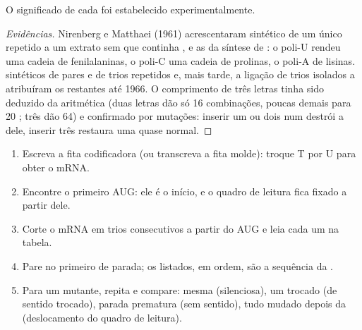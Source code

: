 \begin{proposition}\label{prop:g11:gene-expression:readcode}
O significado de cada  foi estabelecido experimentalmente.
\end{proposition}
\begin{proof}[Evidências]
Nirenberg e Matthaei (1961) acrescentaram  sintético de um único
 repetido a um extrato sem  que continha ,
 e as  da síntese de : o poli-U rendeu uma
cadeia de fenilalaninas, o poli-C uma cadeia de prolinas, o poli-A de
lisinas.  sintéticos de pares e de trios repetidos e, mais tarde, a
ligação de trios isolados a  atribuíram os  restantes
até 1966. O comprimento de três letras tinha sido deduzido da
aritmética (duas letras dão só 16 combinações, poucas demais para 20
; três dão 64) e confirmado por mutações: inserir um ou dois
 num  destrói a  dele, inserir três restaura
uma  quase normal.
\end{proof}

\begin{method}\label{met:g11:gene-expression:translate}
\begin{enumerate}
  \item Escreva a fita codificadora (ou transcreva a fita molde):
        troque T por U para obter o mRNA.
  \item Encontre o primeiro AUG: ele é o início, e o quadro de leitura
        fica fixado a partir dele.
  \item Corte o mRNA em trios consecutivos a partir do AUG e leia cada
        um na tabela.
  \item Pare no primeiro  de parada; os  listados, em
        ordem, são a sequência da .
  \item Para um mutante, repita e compare: mesma 
        (silenciosa), um  trocado (de sentido trocado),
        parada prematura (sem sentido), tudo mudado depois da 
        (deslocamento do quadro de leitura).
\end{enumerate}
\end{method}

